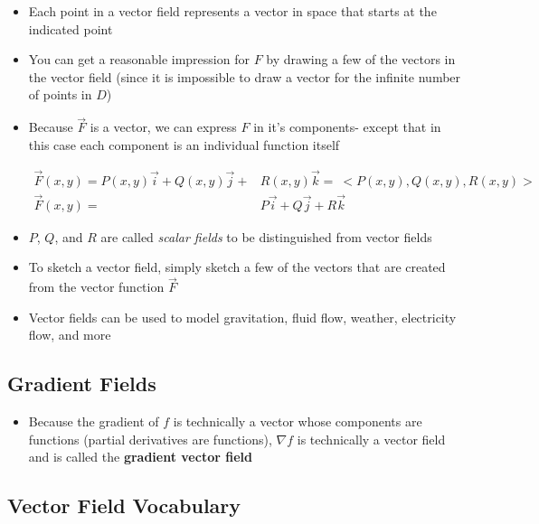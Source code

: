 \documentclass{package/notes}
\begin{document}
\begin{itemize}
	\item Each point in a vector field represents a vector in space that starts at the indicated point
	\item You can get a reasonable impression for $F$ by drawing a few of the vectors in the vector field (since it is impossible to draw a vector for the infinite number of points in $D$)
	\item Because $\vec F$ is a vector, we can express $F$ in it's components- except that in this case each component is an individual function itself
	
	$$
	\begin{aligned}
		\vec F(x,y)=P(x,y)\vec i + Q(x,y) \vec j+ &R(x,y)\vec k= \:<P(x,y),Q(x,y),R(x,y)>\\
		\vec F(x,y) =& P\vec i + Q\vec j + R\vec k
	\end{aligned}
	$$
\end{itemize}

\begin{itemize}
	\item $P$, $Q$, and $R$ are called \textit{scalar fields} to be distinguished from vector fields
	\item To sketch a vector field, simply sketch a few of the vectors that are created from the vector function $\vec F$
	\item Vector fields can be used to model gravitation, fluid flow, weather, electricity flow, and more
\end{itemize}


\subsection{Gradient Fields}

\begin{itemize}
	\item Because the gradient of $f$ is technically a vector whose components are functions (partial derivatives are functions), $\nabla f$ is technically a vector field and is called the \textbf{gradient vector field}
\end{itemize}


\subsection{Vector Field Vocabulary}
\end{document}
